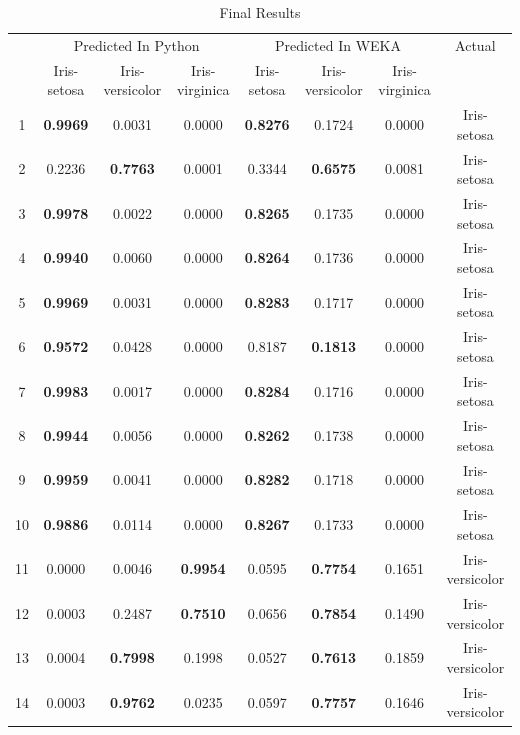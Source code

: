 \documentclass{article}
\begin{document}
\begin{table}[H]
    \centering
    \caption{Final Results}
    \begin{tabular}{|c|ccc|ccc|c|}
        \hline
         & \multicolumn{3}{|c|}{Predicted In Python} & \multicolumn{3}{|c|}{Predicted In WEKA} & Actual \\
        \cline{2-7}
         & Iris-setosa & Iris-versicolor & Iris-virginica & Iris-setosa & Iris-versicolor & Iris-virginica & \\
        \hline
        1 & \textbf{0.9969} & 0.0031 & 0.0000 & \textbf{0.8276} & 0.1724 & 0.0000 & Iris-setosa \\
        \hline
        2 & 0.2236 & \textbf{0.7763} & 0.0001 & 0.3344 & \textbf{0.6575} & 0.0081 & Iris-setosa \\
        \hline
        3 & \textbf{0.9978} & 0.0022 & 0.0000 & \textbf{0.8265} & 0.1735 & 0.0000 & Iris-setosa \\
        \hline
        4 & \textbf{0.9940} & 0.0060 & 0.0000 & \textbf{0.8264} & 0.1736 & 0.0000 & Iris-setosa \\
        \hline
        5 & \textbf{0.9969} & 0.0031 & 0.0000 & \textbf{0.8283} & 0.1717 & 0.0000 & Iris-setosa \\
        \hline
        6 & \textbf{0.9572} & 0.0428 & 0.0000 & 0.8187 & \textbf{0.1813} & 0.0000 & Iris-setosa \\
        \hline
        7 & \textbf{0.9983} & 0.0017 & 0.0000 & \textbf{0.8284} & 0.1716 & 0.0000 & Iris-setosa \\
        \hline
        8 & \textbf{0.9944} & 0.0056 & 0.0000 & \textbf{0.8262} & 0.1738 & 0.0000 & Iris-setosa \\
        \hline
        9 & \textbf{0.9959} & 0.0041 & 0.0000 & \textbf{0.8282} & 0.1718 & 0.0000 & Iris-setosa \\
        \hline
        10 & \textbf{0.9886} & 0.0114 & 0.0000 & \textbf{0.8267} & 0.1733 & 0.0000 & Iris-setosa \\
        \hline
        11 & 0.0000 & 0.0046 & \textbf{0.9954} & 0.0595 & \textbf{0.7754} & 0.1651 & Iris-versicolor \\
        \hline
        12 & 0.0003 & 0.2487 & \textbf{0.7510} & 0.0656 & \textbf{0.7854} & 0.1490 & Iris-versicolor \\
        \hline
        13 & 0.0004 & \textbf{0.7998} & 0.1998 & 0.0527 & \textbf{0.7613} & 0.1859 & Iris-versicolor \\
        \hline
        14 & 0.0003 & \textbf{0.9762} & 0.0235 & 0.0597 & \textbf{0.7757} & 0.1646 & Iris-versicolor \\

\end{tabular}
\end{table}
\end{document}
